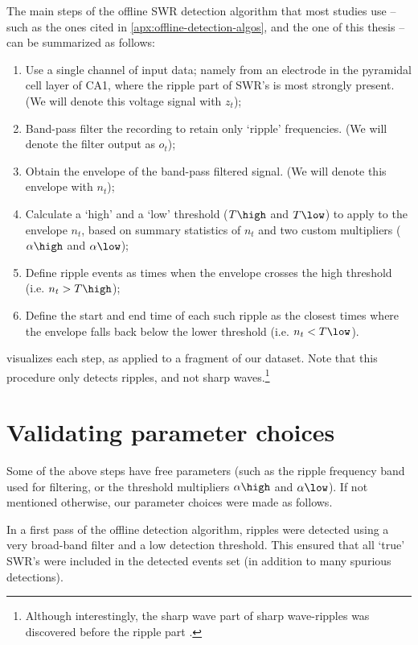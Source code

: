 The main steps of the offline SWR detection algorithm that most studies use -- such as the ones cited in \cref{apx:offline-detection-algos}, and the one of this thesis -- can be summarized as follows:
\begin{enumerate}
\item Use a single channel of input data; namely from an electrode in the pyramidal cell layer of CA1, where the ripple part of SWR's is most strongly present. (We will denote this voltage signal with $z_t$);
\item Band-pass filter the recording to retain only `ripple' frequencies. (We will denote the filter output as $o_t$);
\item Obtain the envelope of the band-pass filtered signal. (We will denote this envelope with $n_t$);
\item Calculate a `high' and a `low' threshold ($T\high$ and $T\low$) to apply to the envelope $n_t$, based on summary statistics of $n_t$ and two custom multipliers ($\alpha\high$ and $\alpha\low$);
\item Define ripple events as times when the envelope crosses the high threshold (i.e. $n_t > T\high$);
\item Define the start and end time of each such ripple as the closest times where the envelope falls back below the lower threshold (i.e. $n_t < T\low$).
\end{enumerate}

 visualizes each step, as applied to a fragment of our dataset. Note that this procedure only detects ripples, and not sharp waves.\footnote{Although interestingly, the sharp wave part of sharp wave-ripples was discovered before the ripple part \cite[p. 1]{Buzsaki2015}.}




\section{Validating parameter choices}
\label{sec:validating-parameter-choices}

Some of the above steps have free parameters (such as the ripple frequency band used for filtering, or the threshold multipliers $\alpha\high$ and $\alpha\low$). If not mentioned otherwise, our parameter choices were made as follows.

In a first pass of the offline detection algorithm, ripples were detected using a very broad-band filter and a low detection threshold. This ensured that all `true' SWR's were included in the detected events set (in addition to many spurious detections).

